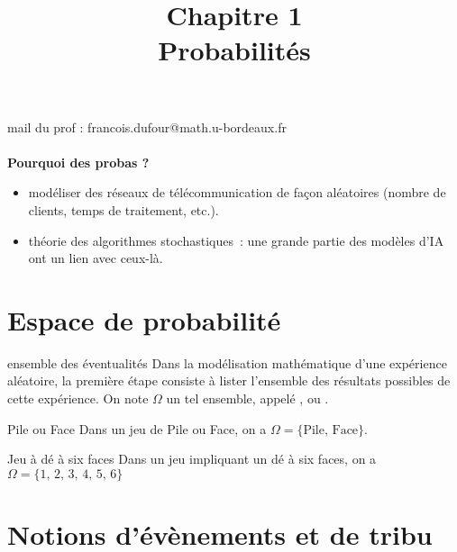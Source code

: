 

\setcounter{chapitre}{1}

\title{\Large Chapitre 1 \\ \Huge Probabilités}



\maketitle

\newcommand{\tribu}[0]{\mathcal{T}}
\newcommand{\univ}[0]{\Omega}
\newcommand{\proba}[0]{\mathbb{P}}

mail du prof : francois.dufour@math.u-bordeaux.fr
\\ \\
\textbf{Pourquoi des probas ?}
\begin{itemize}
    \item modéliser des réseaux de télécommunication de façon aléatoires (nombre de clients, temps de traitement, etc.).
    \item théorie des algorithmes stochastiques~: une grande partie des modèles d'IA ont un lien avec ceux-là.
\end{itemize}

\section*{Espace de probabilité}

\begin{definition}{}{ensemble des éventualités}
    Dans la modélisation mathématique d'une expérience aléatoire, la première étape consiste à lister l'ensemble des résultats possibles de cette expérience. On note $\Omega$ un tel ensemble, appelé , ou .
\end{definition}

\begin{exemple}{}{Pile ou Face}
    Dans un jeu de Pile ou Face, on a $\Omega = \{\text{Pile},\, \text{Face}\}$.
\end{exemple}

\begin{exemple}{}{Jeu à dé à six faces}
    Dans un jeu impliquant un dé à six faces, on a $\Omega = \{1,\, 2,\, 3,\, 4,\, 5,\, 6\}$
    
\end{exemple}

\section{Notions d'évènements et de tribu}

